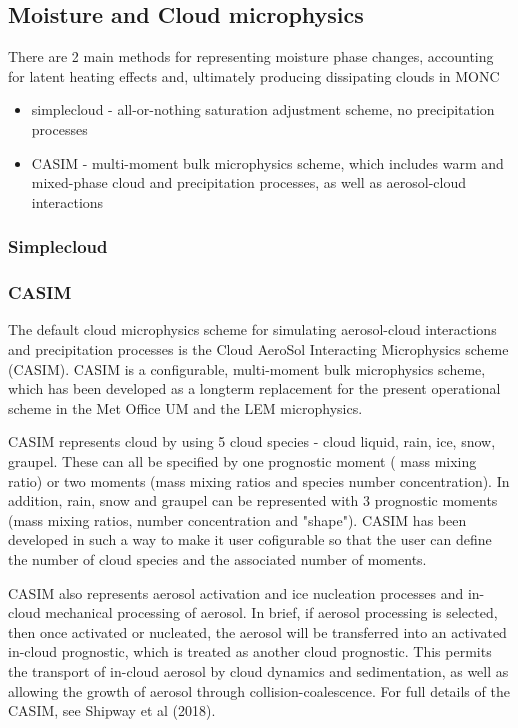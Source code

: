 \documentclass[a4paper,11pt]{article}
\begin{document}
\subsection{Moisture and Cloud microphysics}

There are 2 main methods for representing moisture phase changes, accounting
for latent heating effects and, ultimately producing dissipating clouds in MONC

\begin{itemize}
  \item {simplecloud - all-or-nothing saturation adjustment scheme,
  no precipitation processes}
  \item {CASIM - multi-moment bulk microphysics scheme, which includes warm and
  mixed-phase cloud and precipitation processes, as well as
  aerosol-cloud interactions}
\end{itemize}

\subsubsection{Simplecloud}

\subsubsection{CASIM}

The default cloud microphysics scheme for simulating aerosol-cloud interactions
and precipitation processes is the Cloud AeroSol Interacting Microphysics scheme
(CASIM). CASIM is a configurable, multi-moment bulk microphysics scheme, which has
been developed as a longterm replacement for the present operational scheme in the
Met Office UM and the LEM microphysics.

CASIM represents cloud by using 5 cloud species - cloud liquid,
rain, ice, snow, graupel. These can all be specified by one prognostic moment (
mass mixing ratio) or two moments (mass mixing ratios and species number concentration).
In addition, rain, snow and graupel can be represented with 3 prognostic moments
(mass mixing ratios, number concentration and "shape"). CASIM has been developed
in such a way to make it user cofigurable so that the user can define the
number of cloud species and the associated number of moments.

CASIM also represents aerosol activation and ice nucleation processes and in-cloud
mechanical processing of aerosol. In brief, if aerosol processing is
selected, then once activated or nucleated, the aerosol will be
transferred into an activated in-cloud prognostic, which is treated as another cloud
prognostic. This permits the transport of in-cloud aerosol by cloud dynamics and
sedimentation, as well as allowing the growth of aerosol through collision-coalescence.
For full details of the CASIM, see Shipway et al (2018).
\end{document}
